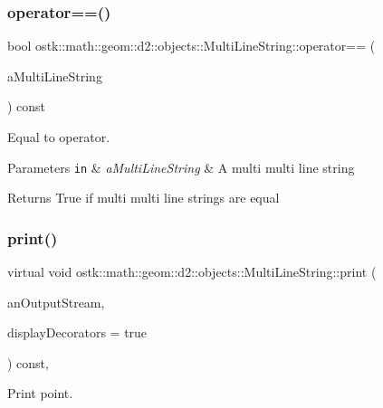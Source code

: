 \subsubsection{\texorpdfstring{operator==()}{operator==()}}
{\footnotesize\ttfamily bool ostk\+::math\+::geom\+::d2\+::objects\+::\+Multi\+Line\+String\+::operator== (\begin{DoxyParamCaption}\item[{const \hyperlink{classostk_1_1math_1_1geom_1_1d2_1_1objects_1_1_multi_line_string}{Multi\+Line\+String} \&}]{a\+Multi\+Line\+String }\end{DoxyParamCaption}) const}



Equal to operator. 


\begin{DoxyParams}[1]{Parameters}
\mbox{\tt in}  & {\em a\+Multi\+Line\+String} & A multi multi line string \\
\hline
\end{DoxyParams}
\begin{DoxyReturn}{Returns}
True if multi multi line strings are equal 
\end{DoxyReturn}
\mbox{\label{classostk_1_1math_1_1geom_1_1d2_1_1objects_1_1_multi_line_string_a5e90edd640ee9262194eb07d943bb8bb}} 
\subsubsection{\texorpdfstring{print()}{print()}}
{\footnotesize\ttfamily virtual void ostk\+::math\+::geom\+::d2\+::objects\+::\+Multi\+Line\+String\+::print (\begin{DoxyParamCaption}\item[{std\+::ostream \&}]{an\+Output\+Stream,  }\item[{bool}]{display\+Decorators = {\ttfamily true} }\end{DoxyParamCaption}) const\hspace{0.3cm}{\ttfamily [override]}, {\ttfamily [virtual]}}



Print point. 


